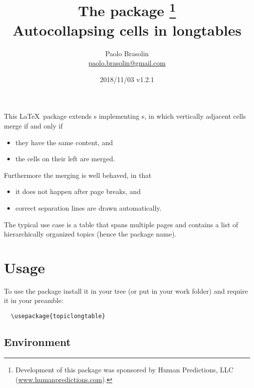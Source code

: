 \documentclass[full,kernel]{l3doc}
\begin{document}
\title{%
  The  package%
  \thanks{Development of this package was sponsored by Human Predictions,
    LLC (\href{http://www.humanpredictions.com}{www.humanpredictions.com}).}\\
  Autocollapsing cells in longtables
}

\author{
  Paolo Brasolin\\
  \href{mailto:paolo.brasolin@gmail.com}{paolo.brasolin@gmail.com}
}

\date{2018/11/03 v1.2.1}

\maketitle

\begin{documentation}


This \LaTeX\ package extends s implementing
s, in which vertically adjacent cells merge if and only if
\begin{itemize}
  \item they have the same content, and
  \item the cells on their left are merged.
\end{itemize}

Furthermore the merging is well behaved, in that
\begin{itemize}
  \item it does not happen after page breaks, and
  \item correct separation lines are drawn automatically.
\end{itemize}

The typical use case is a table that spans multiple pages and
contains a list of hierarchically organized topics (hence the package
name).




\section*{Usage}

To use the package install it in your tree (or put  in your work folder) and require it in your preamble:

\begin{verbatim}
  \usepackage{topiclongtable}
\end{verbatim}




\subsection*{Environment}


\end{documentation}
\end{document}
